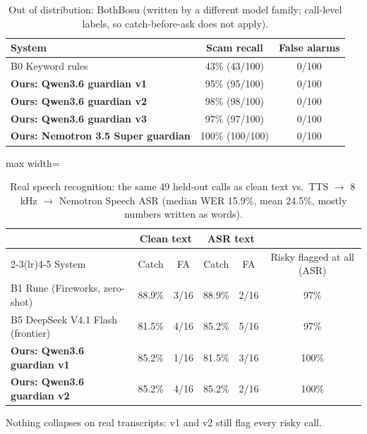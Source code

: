 \documentclass[11pt]{article}
\begin{document}
\begin{table}[H]\centering\small
\caption{Out of distribution: BothBosu (written by a different model family; call-level labels, so catch-before-ask does not apply).}\label{tab:bb}
\begin{tabular}{lcc}\toprule System & Scam recall & False alarms \\ \midrule
B0 Keyword rules & 43\% (43/100) & 0/100 \\
\textbf{Ours: Qwen3.6 guardian v1} & 95\% (95/100) & 0/100 \\
\textbf{Ours: Qwen3.6 guardian v2} & 98\% (98/100) & 0/100 \\
\textbf{Ours: Qwen3.6 guardian v3} & 97\% (97/100) & 0/100 \\
\textbf{Ours: Nemotron 3.5 Super guardian} & 100\% (100/100) & 0/100 \\
\bottomrule\end{tabular}\end{table}

\begin{table}[H]\centering\small
\caption{Real speech recognition: the same 49 held-out calls as clean text vs.\ TTS $\to$ 8\,kHz $\to$ Nemotron Speech ASR (median WER 15.9\%, mean 24.5\%, mostly numbers written as words).}\label{tab:asr}
\begin{adjustbox}{max width=\linewidth}\begin{tabular}{lccccc}\toprule
& \multicolumn{2}{c}{Clean text} & \multicolumn{2}{c}{ASR text} & \\ \cmidrule(lr){2-3}\cmidrule(lr){4-5}
System & Catch & FA & Catch & FA & Risky flagged at all (ASR) \\ \midrule
B1 Rune (Fireworks, zero-shot) & 88.9\% & 3/16 & 88.9\% & 2/16 & 97\% \\
B5 DeepSeek V4.1 Flash (frontier) & 81.5\% & 4/16 & 85.2\% & 5/16 & 97\% \\
\textbf{Ours: Qwen3.6 guardian v1} & 85.2\% & 1/16 & 81.5\% & 3/16 & 100\% \\
\textbf{Ours: Qwen3.6 guardian v2} & 85.2\% & 4/16 & 85.2\% & 2/16 & 100\% \\
\bottomrule\end{tabular}\end{adjustbox}
\par\smallskip\footnotesize Nothing collapses on real transcripts: v1 and v2 still flag every risky call.
\end{table}
\end{document}
